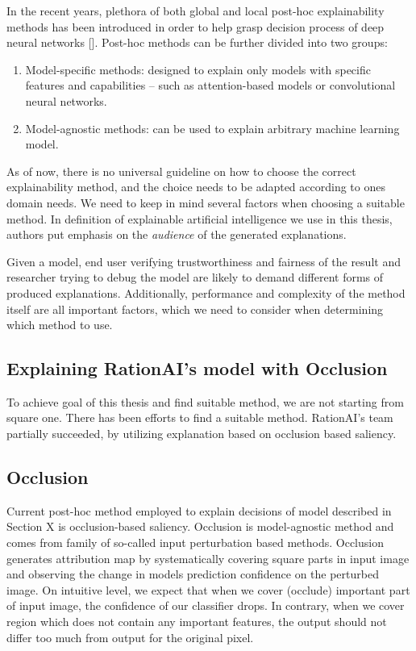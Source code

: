 In the recent years, plethora of both global and local post-hoc explainability methods has been introduced in order to help grasp decision process of deep neural networks []. Post-hoc methods can be further divided into two groups: 

\begin{enumerate}
    \item Model-specific methods: designed to explain only models with specific features and capabilities -- such as attention-based models or convolutional neural networks.
    \item Model-agnostic methods: can be used to explain arbitrary machine learning model.
\end{enumerate}


As of now, there is no universal guideline on how to choose the correct explainability method, and the choice needs to be adapted according to ones domain needs. We need to keep in mind several factors when choosing a suitable method. In definition of explainable artificial intelligence we use in this thesis, authors put emphasis on the \emph{audience} of the generated explanations.

Given a model, end user verifying trustworthiness and fairness of the result and researcher trying to debug the model are likely to demand different forms of produced explanations. Additionally, performance and complexity of the method itself are all important factors, which we need to consider when determining which method to use.


\subsection{Explaining RationAI's model with Occlusion}

To achieve goal of this thesis and find suitable method, we are not starting from square one. There has been efforts to find a suitable method. RationAI's team partially succeeded, by utilizing explanation based on occlusion based saliency.

\subsection{Occlusion}

Current post-hoc method employed to explain decisions of model described in Section X is occlusion-based saliency. Occlusion is model-agnostic method and comes from family of so-called input perturbation based methods. Occlusion generates attribution map by systematically covering square parts in input image and observing the change in models prediction confidence on the perturbed image. On intuitive level, we expect that when we cover (occlude) important part of input image, the confidence of our classifier drops. In contrary, when we cover region which does not contain any important features, the output should not differ too much from output for the original pixel.


